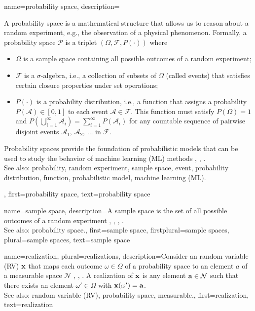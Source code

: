 { 
 {name={probability space}, 
 	description={A probability space is a mathematical 
 		structure that allows us to reason about a random experiment, e.g., the observation 
		of a physical phenomenon. 
 	   	Formally, a probability space $\mathcal{P}$ is a triplet $(\Omega, \mathcal{F}, P\left(\cdot\right))$ where
 		\begin{itemize} 
 			\item  $\Omega$ is a sample space containing all possible outcomes of a random experiment;
 			\item  $\mathcal{F}$ is a $\sigma$-algebra, i.e., a collection of subsets of 
			$\Omega$ (called events) that satisfies certain closure properties under set operations;
 			\item $P\left(\cdot\right)$ is a probability distribution, i.e., a function that assigns a probability $P(\mathcal{A}) \in [0,1]$ 
 			to each event $\mathcal{A} \in \mathcal{F}$. This function must satisfy $P\left(\Omega\right) = 1$ and 
			$P\left(\bigcup_{i=1}^{\infty} \mathcal{A}_i\right) = \sum_{i=1}^{\infty} P\left(\mathcal{A}_i\right)$ for any 
 			countable sequence of pairwise disjoint events $\mathcal{A}_1, \,\mathcal{A}_2, \,\ldots$ in $\mathcal{F}$.
 		\end{itemize}
 		Probability spaces provide the foundation of probabilistic models that can be 
		used to study the behavior of machine learning (ML) methods \cite{BillingsleyProbMeasure}, \cite{GrayProbBook}, \cite{ross2013first}.
				\\
		See also: probability, random experiment, sample space, event, probability distribution, function, probabilistic model, machine learning (ML).},  
 	first={probability space}, 
 	text={probability space}
 }
 
 
  {name={sample space}, 
  	description={A sample space is the set of all possible 
		outcomes of a random experiment \cite{BillingsleyProbMeasure}, 
		\cite{BertsekasProb}, \cite{papoulis}, \cite{AshProbMeasure}. 
		\\
 		See also: probability space.},  
  	first={sample space}, 
 	firstplural={sample spaces},
 	plural={sample spaces},
  	text={sample space}
  }
 
	
{name={realization}, plural={realizations},
	description={Consider an random variable (RV) ${\bf x}$ that maps each outcome 
		$\omega \in \Omega$ of a probability space to an element $a$ of a 
		measurable space $\mathcal{N}$ \cite{RudinBookPrinciplesMatheAnalysis}, \cite{BillingsleyProbMeasure}, \cite{HalmosMeasure}. 
		A realization of ${\bf x}$ is any element ${\bf a} \in \mathcal{N}$ such that there exists 
		an element $\omega' \in \Omega$ with ${\bf x}(\omega') = {\bf a}$.
			\\
		See also: random variable (RV), probability space, measurable.}, 
	first={realization},
	text={realization}  
}

}
